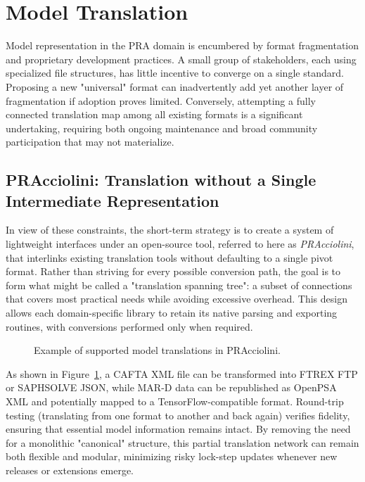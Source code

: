 \section{Model Translation}
Model representation in the PRA domain is encumbered by format fragmentation and proprietary development practices. A small group of stakeholders, each using specialized file structures, has little incentive to converge on a single standard. Proposing a new "universal" format can inadvertently add yet another layer of fragmentation if adoption proves limited. Conversely, attempting a fully connected translation map among all existing formats is a significant undertaking, requiring both ongoing maintenance and broad community participation that may not materialize.

\subsection{PRAcciolini: Translation without a Single Intermediate Representation}
In view of these constraints, the short-term strategy is to create a system of lightweight interfaces under an open-source tool, referred to here as \emph{PRAcciolini}, that interlinks existing translation tools without defaulting to a single pivot format. Rather than striving for every possible conversion path, the goal is to form what might be called a "translation spanning tree": a subset of connections that covers most practical needs while avoiding excessive overhead. This design allows each domain-specific library to retain its native parsing and exporting routines, with conversions performed only when required.

\begin{figure}[h!]
  
    \caption{Example of supported model translations in PRAcciolini.}
  \label{fig:translations}
\end{figure}

As shown in Figure~\ref{fig:translations}, a CAFTA XML file can be transformed into FTREX FTP or SAPHSOLVE JSON, while MAR-D data can be republished as OpenPSA XML and potentially mapped to a TensorFlow-compatible format. Round-trip testing (translating from one format to another and back again) verifies fidelity, ensuring that essential model information remains intact. By removing the need for a monolithic "canonical" structure, this partial translation network can remain both flexible and modular, minimizing risky lock-step updates whenever new releases or extensions emerge.

